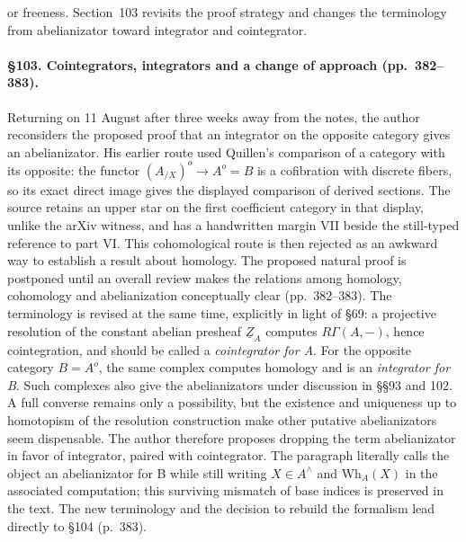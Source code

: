 or freeness. Section~103 revisits the proof strategy and changes the terminology from abelianizator toward integrator and cointegrator.

\paragraph{\S103. Cointegrators, integrators and a change of approach (pp.\ 382--383).}
Returning on 11 August after three weeks away from the notes, the author reconsiders the proposed proof that an integrator on the opposite category gives an abelianizator. His earlier route used Quillen's comparison of a category with its opposite: the functor $(A_{/X})^o\to A^o=B$ is a cofibration with discrete fibers, so its exact direct image gives the displayed comparison of derived sections. The source retains an upper star on the first coefficient category in that display, unlike the arXiv witness, and has a handwritten margin VII beside the still-typed reference to part VI. This cohomological route is then rejected as an awkward way to establish a result about homology. The proposed natural proof is postponed until an overall review makes the relations among homology, cohomology and abelianization conceptually clear (pp.\ 382--383). The terminology is revised at the same time, explicitly in light of \S69: a projective resolution of the constant abelian presheaf $\underline Z_A$ computes $R\Gamma(A,-)$, hence cointegration, and should be called a \emph{cointegrator for A}. For the opposite category $B=A^o$, the same complex computes homology and is an \emph{integrator for B}. Such complexes also give the abelianizators under discussion in \S\S93 and 102. A full converse remains only a possibility, but the existence and uniqueness up to homotopism of the resolution construction make other putative abelianizators seem dispensable. The author therefore proposes dropping the term abelianizator in favor of integrator, paired with cointegrator. The paragraph literally calls the object an abelianizator for B while still writing $X\in A^\wedge$ and $\mathrm{Wh}_A(X)$ in the associated computation; this surviving mismatch of base indices is preserved in the text. The new terminology and the decision to rebuild the formalism lead directly to \S104 (p.\ 383).

